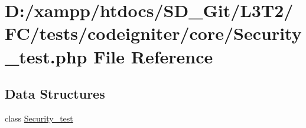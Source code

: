 \hypertarget{tests_2codeigniter_2core_2_security__test_8php}{}\section{D\+:/xampp/htdocs/\+S\+D\+\_\+\+Git/\+L3\+T2/\+F\+C/tests/codeigniter/core/\+Security\+\_\+test.php File Reference}
\label{tests_2codeigniter_2core_2_security__test_8php}
\subsection*{Data Structures}
\begin{DoxyCompactItemize}
\item 
class \hyperlink{class_security__test}{Security\+\_\+test}
\end{DoxyCompactItemize}
